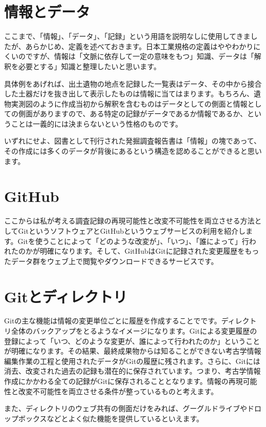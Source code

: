 \documentclass[14Q]{jsarticle}
\begin{document}
\section{情報とデータ}
ここまで、「情報」、「データ」、「記録」という用語を説明なしに使用してきましたが、あらかじめ、定義を述べておきます。日本工業規格の定義はややわかりにくいのですが、情報は「文脈に依存して一定の意味をもつ」知識、データは「解釈を必要とする」知識と整理したいと思います。

具体例をあげれば、出土遺物の地点を記録した一覧表はデータ、その中から接合した土器だけを抜き出して表示したものは情報に当てはまります。もちろん、遺物実測図のように作成当初から解釈を含むものはデータとしての側面と情報としての側面がありますので、ある特定の記録がデータであるか情報であるか、ということは一義的には決まらないという性格のものです。

いずれにせよ、図書として刊行された発掘調査報告書は「情報」の塊であって、その作成には多くのデータが背後にあるという構造を認めることができると思います。

\section{GitHub}
ここからは私が考える調査記録の再現可能性と改変不可能性を両立させる方法としてGitというソフトウェアとGitHubというウェブサービスの利用を紹介します。Gitを使うことによって「どのような改変が」、「いつ」、「誰によって」行われたのかが明確になります。そして、GitHubはGitに記録された変更履歴をもったデータ群をウェブ上で閲覧やダウンロードできるサービスです。

\section{Gitとディレクトリ}
Gitの主な機能は情報の変更単位ごとに履歴を作成することでです。ディレクトリ全体のバックアップをとるようなイメージになります。Gitによる変更履歴の登録によって「いつ、どのような変更が、誰によって行われたのか」ということが明確になります。その結果、最終成果物からは知ることができない考古学情報編集作業の工程と使用されたデータがGitの履歴に残されます。さらに、Gitには消去、改変された過去の記録も潜在的に保存されています。つまり、考古学情報作成にかかわる全ての記録がGitに保存されることとなります。情報の再現可能性と改変不可能性を両立させる条件が整っているものと考えます。

また、ディレクトリのウェブ共有の側面だけをみれば、グーグルドライブやドロップボックスなどとよく似た機能を提供しているといえます。
\end{document}
